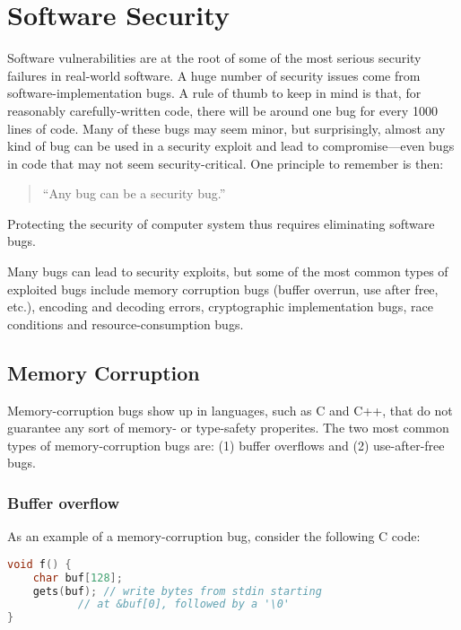 \chapter{Software Security}

Software vulnerabilities are at the root of 
some of the most serious security failures
in real-world software.
A huge number of security issues come from
software-implementation bugs.
A rule of thumb to keep in mind is that, for reasonably
carefully-written code, there will be around one
bug for every 1000 lines of code. Many of these
bugs may seem minor, but surprisingly, almost any
kind of bug can be used in a security exploit and
lead to compromise---even bugs in code that may
not seem security-critical. One principle to remember
is then:
\begin{quote}
``Any bug can be a security bug.''
\end{quote}
Protecting the security of computer system thus requires
eliminating software bugs. 

Many bugs can lead to security exploits, but some
of the most common types of exploited bugs include
memory corruption bugs (buffer overrun, use after free, etc.), 
encoding and decoding errors,
cryptographic implementation bugs,
race conditions
and resource-consumption bugs.

\section{Memory Corruption}

Memory-corruption bugs show up in languages, such as C and C++, that
do not guarantee any sort of memory- or type-safety properites.
The two most common types of memory-corruption bugs 
are: (1) buffer overflows and (2) use-after-free bugs.

\subsection{Buffer overflow}
As an example of a memory-corruption bug, 
consider the following C code:

\begin{lstlisting}[language=c]
void f() {
	char buf[128];
	gets(buf); // write bytes from stdin starting
		   // at &buf[0], followed by a '\0'
}
\end{lstlisting}

